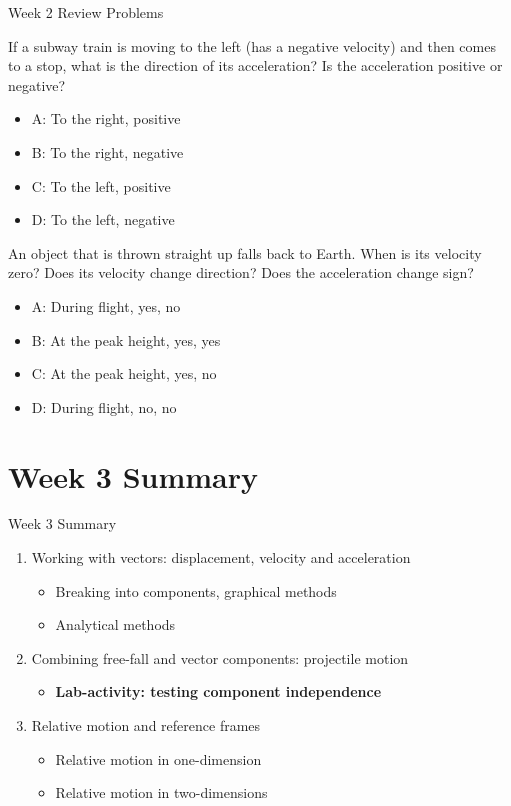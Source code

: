 \documentclass{beamer}
\begin{document}
\begin{frame}{Week 2 Review Problems}
\small
\begin{minipage}[b]{0.45\linewidth}
If a subway train is moving to the left (has a negative velocity) and then comes to a stop, what is the direction of its acceleration? Is the acceleration positive or negative?
\begin{itemize}
\vspace{0.5cm}
\item A: To the right, positive
\item B: To the right, negative
\item C: To the left, positive
\item D: To the left, negative
\end{itemize}
\end{minipage}
\hspace{0.5cm}
\begin{minipage}[b]{0.45\linewidth}
An object that is thrown straight up falls back to Earth.  When is its velocity zero?  Does its velocity change direction?  Does the acceleration change sign?
\begin{itemize}
\item A: During flight, yes, no
\item B: At the peak height, yes, yes
\item C: At the peak height, yes, no
\item D: During flight, no, no
\end{itemize}
\end{minipage}
\end{frame}

\section{Week 3 Summary}

\begin{frame}{Week 3 Summary}
\begin{enumerate}
\item Working with vectors: displacement, velocity and acceleration
\begin{itemize}
\item Breaking into components, graphical methods
\item Analytical methods
\end{itemize}
\item Combining free-fall and vector components: \alert{projectile motion}
\begin{itemize}
\item \textbf{Lab-activity: testing component independence}
\end{itemize}
\item Relative motion and reference frames
\begin{itemize}
\item Relative motion in one-dimension
\item Relative motion in two-dimensions
\end{itemize}
\end{enumerate}
\end{frame}
\end{document}

